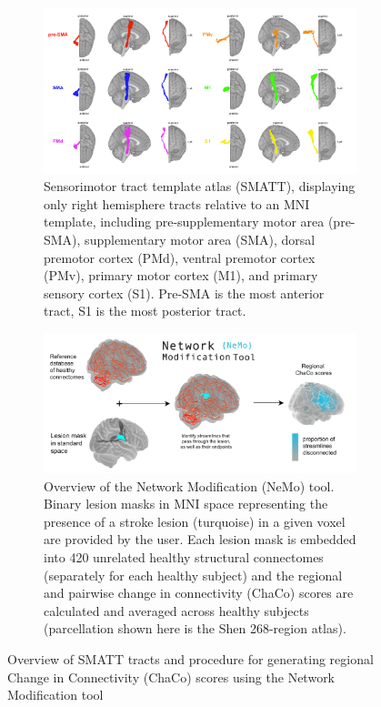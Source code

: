 \documentclass[10pt]{article}
\begin{document}
\begin{figure}
\begin{subfigure}{1\textwidth}
   \includegraphics[width=1\linewidth]{figures/all_SMATT2.png}
    \caption{Sensorimotor tract template atlas (SMATT), displaying only right hemisphere tracts relative to an MNI template, including pre-supplementary motor area (pre-SMA), supplementary motor area (SMA), dorsal premotor cortex (PMd), ventral premotor cortex (PMv),  primary motor cortex (M1), and primary sensory cortex (S1). Pre-SMA is the most anterior tract, S1 is the most posterior tract.}
    \label{smatt}
  \label{fig:sfig1}
\end{subfigure}
\begin{subfigure}{1\textwidth}
  \includegraphics[width=1\linewidth]{figures/Multi-panelML_white_regional.png}
  \caption{Overview of the Network Modification (NeMo) tool. Binary lesion masks in MNI space representing the presence of a stroke lesion (turquoise) in a given voxel are provided by the user. Each lesion mask is embedded into 420 unrelated healthy structural connectomes (separately for each healthy subject) and the regional and pairwise change in connectivity (ChaCo) scores are calculated and averaged across healthy subjects (parcellation shown here is the Shen 268-region atlas). }
  \label{fig:sfig2}
\end{subfigure}
\caption{Overview of SMATT tracts and procedure for generating regional Change in Connectivity (ChaCo) scores using the Network Modification tool}
\label{smatt_and_chaco}
\end{figure}
\end{document}
